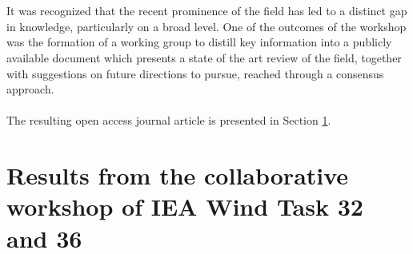 \\\\
It was recognized that the recent prominence of the field has led to a distinct gap in knowledge, particularly on a broad level. One of the outcomes of the workshop was the formation of a working group to distill key information into a publicly available document which presents a state of the art review of the field, together with suggestions on future directions to pursue, reached through a consensus approach.
\\\\
The resulting open access journal article is presented in Section \ref{sec:IEA_paper}.


\clearpage
\section{Results from the collaborative workshop of IEA Wind Task 32 and 36}
\label{sec:IEA_paper}
